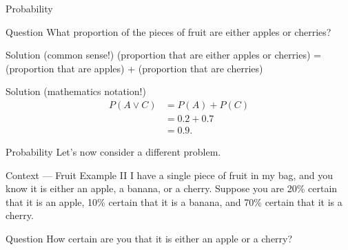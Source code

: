 \documentclass{beamer}
\begin{document}
\begin{frame}{Probability}%
\begin{block}{Question}
What proportion of the pieces of fruit are either apples or cherries?
\end{block}\pause

\begin{exampleblock}{Solution (common sense!)}
(proportion that are either apples or cherries) = \\
\quad(proportion that are apples) + 
     (proportion that are cherries)
\end{exampleblock}\pause

\begin{exampleblock}{Solution (mathematics notation!)}
\vspace{-1em}
\begin{align}
P(A \vee C) &= P(A) + P(C) \\
            &= 0.2 + 0.7   \\
            &= 0.9. 
\end{align}
\end{exampleblock}

\end{frame}






\begin{frame}{Probability}%
Let's now consider a different problem.\pause

\begin{exampleblock}{Context --- Fruit Example II}
I have a single piece of fruit in my bag, and you know it is
either an apple, a banana, or a cherry.
Suppose you are 20\% certain that it is an apple, 10\% certain
that it is a banana, and 70\% certain that it is a cherry.
\end{exampleblock}\pause

\begin{block}{Question}
How certain are you that it is either an apple or a cherry?
\end{block}

\end{frame}%
\end{document}
